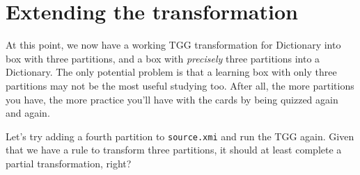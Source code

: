 \newpage
\section{Extending the transformation}
\genHeader







At this point, we now have a working TGG transformation for Dictionary into box with three partitions, and a box with \emph{precisely} three partitions into a
Dictionary. The only potential problem is that a learning box with only three partitions may not be the most useful studying too. After all, the more partitions
you have, the more practice you'll have with the cards by being quizzed again and again.

Let's try adding a fourth partition to \texttt{source.xmi} and run the TGG again. Given that we have a rule to transform three partitions, it should at least
complete a partial transformation, right? 

